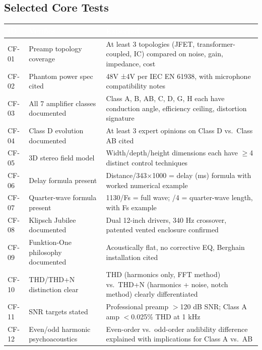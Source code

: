 \documentclass[11pt,letterpaper]{article}
\newcommand{\tableheader}[1]{\textbf{\sffamily\textcolor{white}{#1}}}
\begin{document}
\subsection{Selected Core Tests}

\begin{center}
\begin{tabularx}{\textwidth}{L{1.5cm}L{4cm}X}
\toprule
{}
\tableheader{ID} & \tableheader{Verifies} & \tableheader{Expected} \\
\midrule
CF-01 & Preamp topology coverage & At least 3 topologies (JFET, transformer-coupled, IC) compared on noise, gain, impedance, cost \\
CF-02 & Phantom power spec cited & 48V ±4V per IEC EN 61938, with microphone compatibility notes \\
CF-03 & All 7 amplifier classes documented & Class A, B, AB, C, D, G, H each have conduction angle, efficiency ceiling, distortion signature \\
CF-04 & Class D evolution documented & At least 3 expert opinions on Class D vs.\ Class AB cited \\
CF-05 & 3D stereo field model & Width/depth/height dimensions each have $\geq$4 distinct control techniques \\
CF-06 & Delay formula present & Distance/343$\times$1000 = delay (ms) formula with worked numerical example \\
CF-07 & Quarter-wave formula present & 1130/Fs = full wave; /4 = quarter-wave length, with Fs example \\
CF-08 & Klipsch Jubilee documented & Dual 12-inch drivers, 340 Hz crossover, patented vented enclosure confirmed \\
CF-09 & Funktion-One philosophy documented & Acoustically flat, no corrective EQ, Berghain installation cited \\
CF-10 & THD/THD+N distinction clear & THD (harmonics only, FFT method) vs.\ THD+N (harmonics + noise, notch method) clearly differentiated \\
CF-11 & SNR targets stated & Professional preamp $>$120 dB SNR; Class A amp $<$0.025\% THD at 1 kHz \\
CF-12 & Even/odd harmonic psychoacoustics & Even-order vs.\ odd-order audibility difference explained with implications for Class A vs.\ AB \\
\bottomrule
\end{tabularx}
\end{center}
\end{document}
